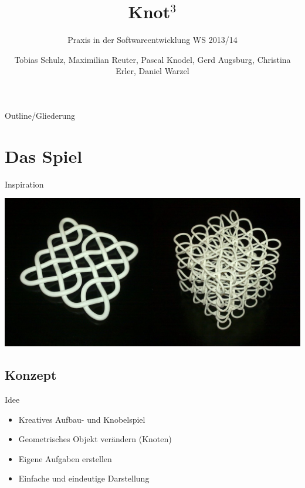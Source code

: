 \documentclass[18pt]{beamer}
\title[]{Knot$^3$ }
\subtitle{Praxis in der Softwareentwicklung WS 2013/14}
\author{Tobias Schulz, Maximilian Reuter, Pascal Knodel, Gerd Augsburg, Christina Erler, Daniel Warzel}
\institute{Institut für Betriebs- und Dialogsysteme, Lehrstuhl für Computergrafik}
\begin{document}

\begin{frame}
\titlepage
\end{frame}

\begin{frame}{Outline/Gliederung}
\tableofcontents
\end{frame}

\section{Das Spiel}
\begin{frame}{Inspiration}
\begin{center}
\includegraphics[scale=0.23]{Knot}
\end{center}
\end{frame}
\subsection{Konzept}
\begin{frame}{Idee}
\begin{itemize}
\item Kreatives Aufbau- und Knobelspiel
\item Geometrisches Objekt verändern (Knoten)
\item Eigene Aufgaben erstellen
\item Einfache und eindeutige Darstellung
\end{itemize}
\end{frame}
\end{document}
